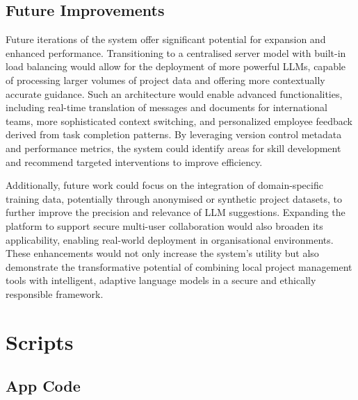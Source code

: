 \documentclass{report}
\begin{document}
\section{Future Improvements}
Future iterations of the system offer significant potential for expansion and enhanced performance. Transitioning to a centralised server model with built-in load balancing would allow for the deployment of more powerful LLMs, capable of processing larger volumes of project data and offering more contextually accurate guidance. Such an architecture would enable advanced functionalities, including real-time translation of messages and documents for international teams, more sophisticated context switching, and personalized employee feedback derived from task completion patterns. By leveraging version control metadata and performance metrics, the system could identify areas for skill development and recommend targeted interventions to improve efficiency.

Additionally, future work could focus on the integration of domain-specific training data, potentially through anonymised or synthetic project datasets, to further improve the precision and relevance of LLM suggestions. Expanding the platform to support secure multi-user collaboration would also broaden its applicability, enabling real-world deployment in organisational environments. These enhancements would not only increase the system's utility but also demonstrate the transformative potential of combining local project management tools with intelligent, adaptive language models in a secure and ethically responsible framework.



\printbibliography 

\appendix
\chapter{Scripts}\label{Scripts}
\section{App Code}
\end{document}
